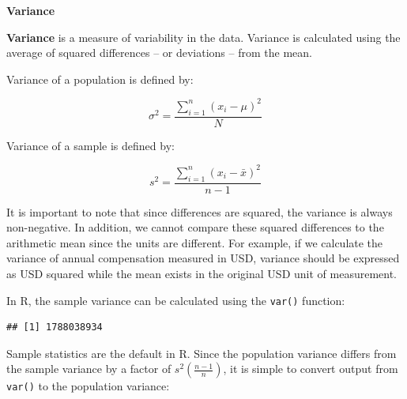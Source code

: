 \documentclass[]{book}
\newenvironment{Shaded}{\begin{snugshade}}{\end{snugshade}}
\newcommand{\CommentTok}[1]{\textcolor[rgb]{0.56,0.35,0.01}{\textit{#1}}}
\newcommand{\DecValTok}[1]{\textcolor[rgb]{0.00,0.00,0.81}{#1}}
\newcommand{\KeywordTok}[1]{\textcolor[rgb]{0.13,0.29,0.53}{\textbf{#1}}}
\newcommand{\NormalTok}[1]{#1}
\newcommand{\OperatorTok}[1]{\textcolor[rgb]{0.81,0.36,0.00}{\textbf{#1}}}
\newcommand{\StringTok}[1]{\textcolor[rgb]{0.31,0.60,0.02}{#1}}
\begin{document}
\textbf{Variance}

\textbf{Variance} is a measure of variability in the data. Variance is calculated using the average of squared differences -- or deviations -- from the mean.

Variance of a population is defined by:

\[ \sigma^{2} = \frac{\displaystyle\sum_{i=1}^{n} (x_{i}-\mu)^{2}}{N} \]

Variance of a sample is defined by:

\[ s^{2} = \frac{\displaystyle\sum_{i=1}^{n} (x_{i}-\bar{x})^{2}}{n-1} \]

It is important to note that since differences are squared, the variance is always non-negative. In addition, we cannot compare these squared differences to the arithmetic mean since the units are different. For example, if we calculate the variance of annual compensation measured in USD, variance should be expressed as USD squared while the mean exists in the original USD unit of measurement.

In R, the sample variance can be calculated using the \texttt{var()} function:

\begin{Shaded}
\end{Shaded}

\begin{verbatim}
## [1] 1788038934
\end{verbatim}

Sample statistics are the default in R. Since the population variance differs from the sample variance by a factor of \(s^2 (\frac{n - 1}{n})\), it is simple to convert output from \texttt{var()} to the population variance:

\begin{Shaded}
\end{Shaded}
\end{document}
